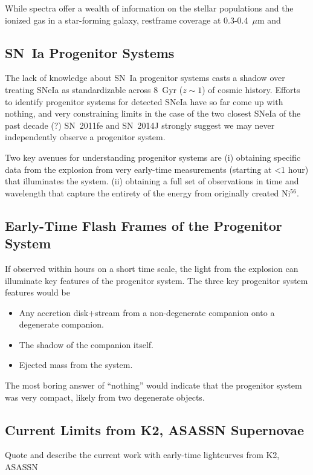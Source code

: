 \documentclass{aastex}
\newcommand{\tbd}{{\color{red}}}
\begin{document}
While spectra offer a wealth of information on the stellar populations and the ionized gas in a star-forming galaxy, restframe coverage at 0.3-0.4~$\mu$m and

\subsection{SN~Ia Progenitor Systems}

The lack of knowledge about SN~Ia progenitor systems casts a shadow over treating SNeIa as standardizable across 8~Gyr ($z\sim1$) of cosmic history.  Efforts to identify progenitor systems for detected SNeIa have so far come up with nothing, and very constraining limits in the case of the two closest SNeIa of the past decade (?) SN~2011fe \citep{??} and SN~2014J \citep{??} strongly suggest we may never independently observe a progenitor system.

Two key avenues for understanding progenitor systems are 
(i) obtaining specific data from the explosion from very early-time measurements (starting at <1 hour) that illuminates the system.
(ii) obtaining a full set of observations in time and wavelength that capture the entirety of the energy from originally created Ni$^{56}$.

\subsection{Early-Time Flash Frames of the Progenitor System}
If observed within hours on a short time scale, the light from the explosion can illuminate key features of the progenitor system.  The three key progenitor system features would be 
\begin{itemize}
\item Any accretion disk+stream from a non-degenerate companion onto a degenerate companion.
\item The shadow of the companion itself.
\item Ejected mass from the system.
\end{itemize}

The most boring answer of ``nothing'' would indicate that the progenitor system was very compact, likely from two degenerate objects.  

\subsection{Current Limits from K2, ASASSN Supernovae}

{\tbd Quote and describe the current work with early-time lightcurves from K2, ASASSN}
\end{document}
